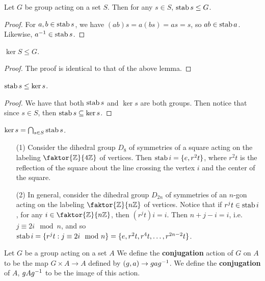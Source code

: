 \begin{lemma}\label{lemma_4.1.4}
  Let $G$ be group acting on a set  $S$. Then for any  $s \in S$,  $\operatorname{stab}{s}
  \leq G$.
\end{lemma}
\begin{proof}
  For $a,b \in \operatorname{stab}{s}$, we have $(ab)s=a(bs)=as=s$, so $ab \in \operatorname{stab}{a}$.
  Likewise, $a^{-1} \in \operatorname{stab}{s}$.
\end{proof}
\begin{corollary}
  $\ker{S} \leq G$.
\end{corollary}
\begin{proof}
  The proof is identical to that of the above lemma.
\end{proof}
\begin{corollary}
  $\operatorname{stab}{s} \leq \ker{s}$.
\end{corollary}
\begin{proof}
  We have that both $\operatorname{stab}{s}$ and $\ker{s}$ are both groups. Then notice that
  since $s \in S$, then  $\operatorname{stab}{s} \subseteq \ker{s}$.
\end{proof}
\begin{corollary}
  $\ker{s}=\bigcap_{s \in S}{\operatorname{stab}{s}}$.
\end{corollary}

\begin{example}\label{example_4.1}
  \begin{enumerate}
    \item[(1)] Consider the dihedral group $D_8$ of symmetries of a square
      acting on the labeling $\faktor{\Z}{4\Z}$ of vertices. Then
      $\operatorname{stab}{i}=\{e,r^2t\}$, where  $r^2t$ is the reflection of the square
      about the line crossing the vertex  $i$ and the center of the
      square.

    \item [(2)] In general, consider the dihedral group $D_{2n}$ of
      symmetries of an $n$-gon acting on the labeling  $\faktor{\Z}{n\Z}$
      of vertices. Notice that if  $r^jt \in \operatorname{stab}{i}$, for any $i \in
      \faktor{\Z}{n\Z}$, then $(r^jt)i=i$. Then $n+j-i=i$, i.e. $j \equiv
      2i \mod{n}$, and so $\operatorname{stab}{i}=\{r^jt : j \equiv 2i \mod{n}\}=\{e,
      r^2t, r^4t, \dots, r^{2n-2}t\}$.
  \end{enumerate}
\end{example}

\begin{definition}
  Let $G$ be a group acting on a set $A$ We define the \textbf{conjugation}
  action of $G$ on  $A$ to be the map $G \times A \rightarrow A$
  defined by $(g,a) \rightarrow gag^{-1}$. We define the \textbf{conjugation}
  of $A$, $gAg^{-1}$ to be the image of this action.
\end{definition}

